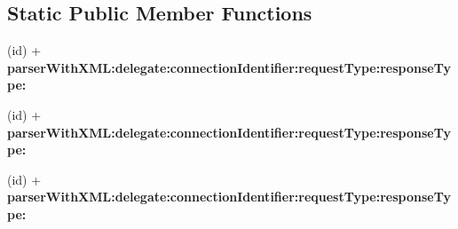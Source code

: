 \subsection*{\-Static \-Public \-Member \-Functions}
\begin{DoxyCompactItemize}
\item 
\hypertarget{interface_m_g_twitter_x_m_l_parser_ae60f3de8166f6844aca286e9eeb3a331}{
(id) + {\bfseries parser\-With\-X\-M\-L\-:delegate\-:connection\-Identifier\-:request\-Type\-:response\-Type\-:}}
\label{interface_m_g_twitter_x_m_l_parser_ae60f3de8166f6844aca286e9eeb3a331}

\item 
\hypertarget{interface_m_g_twitter_x_m_l_parser_ae60f3de8166f6844aca286e9eeb3a331}{
(id) + {\bfseries parser\-With\-X\-M\-L\-:delegate\-:connection\-Identifier\-:request\-Type\-:response\-Type\-:}}
\label{interface_m_g_twitter_x_m_l_parser_ae60f3de8166f6844aca286e9eeb3a331}

\item 
\hypertarget{interface_m_g_twitter_x_m_l_parser_ae60f3de8166f6844aca286e9eeb3a331}{
(id) + {\bfseries parser\-With\-X\-M\-L\-:delegate\-:connection\-Identifier\-:request\-Type\-:response\-Type\-:}}
\label{interface_m_g_twitter_x_m_l_parser_ae60f3de8166f6844aca286e9eeb3a331}

\end{DoxyCompactItemize}
